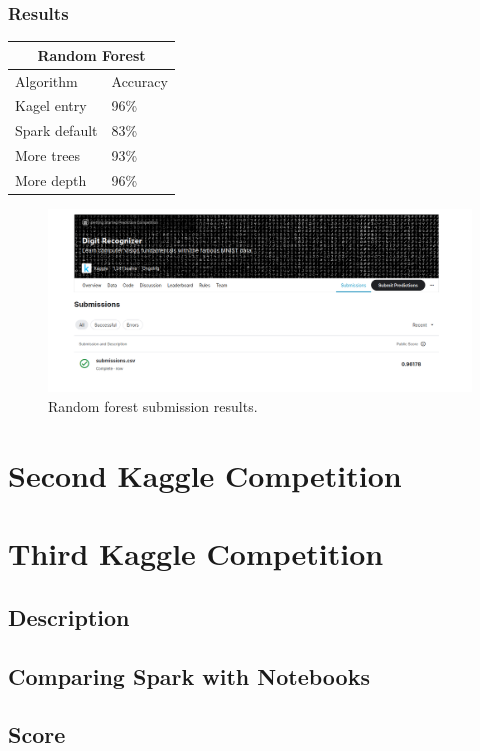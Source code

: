 \documentclass{article}
\begin{document}
	\subsubsection{Results}
		\begin{tabular}{ |p{3cm}||p{3cm}| }
			\hline
			\multicolumn{2}{|c|}{Random Forest} \\
			\hline
			Algorithm& Accuracy\\
			\hline
			Kagel entry	& 	96\%\\
			Spark default&   83\%\\
			More trees &	93\%\\
			More depth &	96\%\\
			\hline
		\end{tabular}
		\begin{figure}[h]
			\centering
			\includegraphics[scale=0.30]{submission_random_forest}
			\caption{Random forest submission results.}
		\end{figure}
	\section{Second Kaggle Competition}
	\section{Third Kaggle Competition}
	\subsection{Description}
	\subsection{Comparing Spark with Notebooks}
	\subsection{Score}
\end{document}
